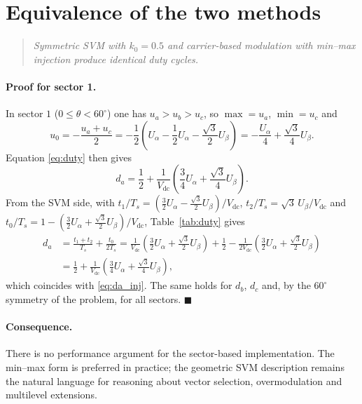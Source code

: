 \documentclass[11pt,a4paper]{article}
\newcommand{\vdc}{V_{\mathrm{dc}}}
\newcommand{\Ts}{T_{s}}
\newcommand{\ualpha}{U_{\alpha}}
\newcommand{\ubeta}{U_{\beta}}
\begin{document}
\section{Equivalence of the two methods}

\begin{quote}
\emph{Symmetric SVM with $k_0 = 0.5$ and carrier-based modulation with min--max
injection produce identical duty cycles.}
\end{quote}

\paragraph{Proof for sector 1.} In sector $1$ ($0 \le \theta < 60^\circ$) one has
$u_a > u_b > u_c$, so $\max = u_a$, $\min = u_c$ and
\begin{equation}
u_0 = -\frac{u_a + u_c}{2}
    = -\frac{1}{2}\left(\ualpha - \frac{1}{2}\ualpha - \frac{\sqrt{3}}{2}\ubeta\right)
    = -\frac{\ualpha}{4} + \frac{\sqrt{3}}{4}\ubeta .
\end{equation}
Equation \eqref{eq:duty} then gives
\begin{equation}
d_a = \frac{1}{2} + \frac{1}{\vdc}\left(\frac{3}{4}\ualpha + \frac{\sqrt{3}}{4}\ubeta\right).
\label{eq:da_inj}
\end{equation}
From the SVM side, with
$t_1/\Ts = \left(\tfrac{3}{2}\ualpha - \tfrac{\sqrt{3}}{2}\ubeta\right)/\vdc$,
$t_2/\Ts = \sqrt{3}\,\ubeta/\vdc$ and
$t_0/\Ts = 1 - \left(\tfrac{3}{2}\ualpha + \tfrac{\sqrt{3}}{2}\ubeta\right)/\vdc$,
Table~\ref{tab:duty} gives
\begin{align}
d_a &= \frac{t_1 + t_2}{\Ts} + \frac{t_0}{2\Ts}
     = \frac{1}{\vdc}\left(\frac{3}{2}\ualpha + \frac{\sqrt{3}}{2}\ubeta\right)
       + \frac{1}{2} - \frac{1}{2\vdc}\left(\frac{3}{2}\ualpha + \frac{\sqrt{3}}{2}\ubeta\right) \nonumber\\
    &= \frac{1}{2} + \frac{1}{\vdc}\left(\frac{3}{4}\ualpha + \frac{\sqrt{3}}{4}\ubeta\right),
\end{align}
which coincides with \eqref{eq:da_inj}. The same holds for $d_b$, $d_c$ and, by the
$60^\circ$ symmetry of the problem, for all sectors. $\blacksquare$

\paragraph{Consequence.} There is no performance argument for the sector-based
implementation. The min--max form is preferred in practice; the geometric SVM
description remains the natural language for reasoning about vector selection,
overmodulation and multilevel extensions.
\end{document}
